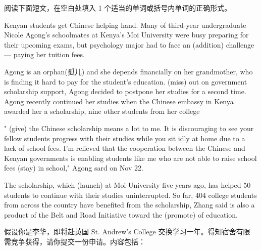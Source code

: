 \documentclass{英语试卷}
\begin{document}
\par 阅读下面短文，在空白处填入 1 个适当的单词或括号内单词的正确形式。\par
\par Kenyan students get Chinese helping hand. Many of third-year undergraduate Nicole Agong's schoolmates at Kenya's Moi University were busy preparing for their upcoming exams, but  psychology major had to face an  (addition) challenge — paying her tuition fees.\par
\par Agong is an orphan(孤儿) and she depends financially on her grandmother, who is finding it hard to pay for the student's education.  (miss) out on government scholarship support, Agong decided to postpone her studies for a second time.  Agong recently continued her studies when the Chinese embassy in Kenya awarded her a scholarship,  nine other students from her college\par
\par " (give) the Chinese scholarship means a lot to me. It is discouraging to see your fellow students progress with their studies while you sit idly at home due to a lack of school fees. I'm relieved that the cooperation between the Chinese and Kenyan governments is enabling students like me who are not able to raise school fees  (stay) in school," Agong sard on Nov 22.\par
\par The scholarship, which  (launch) at Moi University five years ago, has helped 50 students to continue with their studies uninterrupted. So far, 404 college students from across the country have benefited from the scholarship,  Zhang said is also a product of the Belt and Road Initiative toward the  (promote) of education.\par
{}
\par 假设你是李华，即将赴英国 St. Andrew's College 交换学习一年。得知宿舍有限 需竞争获得，请你提交一份申请。内容包括：\par
\end{document}
